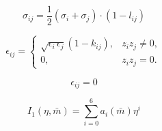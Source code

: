 \documentclass[12pt, letterpaper]{article}
\begin{document}
\begin{equation}
    \sigma_{i j}=\frac{1}{2}\left(\sigma_{i}+\sigma_{j}\right) \cdot \left(1- l_{ij} \right)
    \label{eq:sigma_ij}
\end{equation}


\begin{equation}
    \epsilon_{ij}=
    \begin{cases}
        \sqrt{\epsilon_{i}\,\epsilon_{j}}\left(1-k_{ij}\right), & z_{i} z_{j} \neq 0, \\[6pt]
        0,                                                  & z_{i} z_{j} = 0 .
    \end{cases}
    \label{eq:epsilon_ij_mixing}
\end{equation}


\begin{equation}
    \epsilon_{i j}= 0
    \label{eq:epsilon_ij_ionic_zero}
\end{equation}


\begin{equation}
    I_{1}(\eta, \bar{m})=\sum_{i=0}^6 a_{i}(\bar{m}) \eta^i
    \label{eq:i1_disp}
\end{equation}

\end{document}
